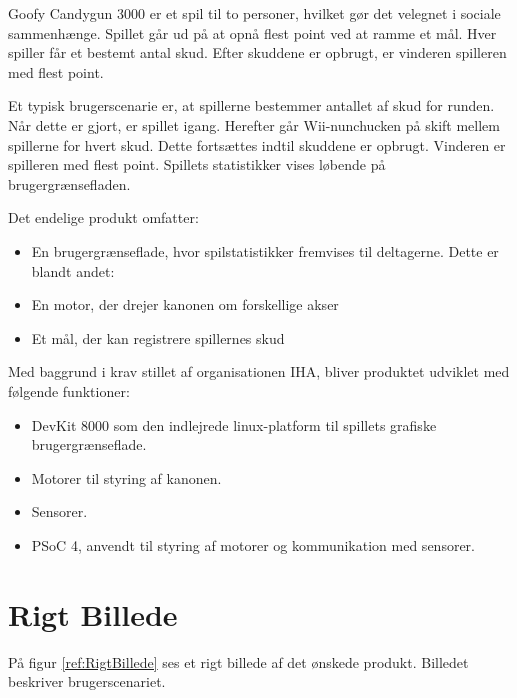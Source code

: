 Goofy Candygun 3000 er et spil til to personer, hvilket gør det velegnet i sociale sammenhænge. Spillet går ud på at opnå flest point ved at ramme et mål. Hver spiller får et bestemt antal skud. Efter skuddene er opbrugt, er vinderen spilleren med flest point.

Et typisk brugerscenarie er, at spillerne bestemmer antallet af skud for runden. Når dette er gjort, er spillet igang. Herefter går Wii-nunchucken på skift mellem spillerne for hvert skud. Dette fortsættes indtil skuddene er opbrugt. Vinderen er spilleren med flest point. Spillets statistikker vises løbende på brugergrænsefladen. 

Det endelige produkt omfatter:
\begin{itemize}
	\item{En brugergrænseflade, hvor spilstatistikker fremvises til deltagerne. Dette er blandt andet:}
	\item{En motor, der drejer kanonen om forskellige akser}
	\item{Et mål, der kan registrere spillernes skud}
\end{itemize}

Med baggrund i krav stillet af organisationen IHA, bliver produktet udviklet med følgende funktioner:

\begin{itemize}
	\item DevKit 8000 som den indlejrede linux-platform til spillets grafiske brugergrænseflade.
	\item Motorer til styring af kanonen.
	\item Sensorer.
	\item PSoC 4, anvendt til styring af motorer og kommunikation med sensorer.
\end{itemize}

\newpage
\section{Rigt Billede}

På figur \ref{ref:RigtBillede} ses et rigt billede af det ønskede produkt. Billedet beskriver brugerscenariet.


